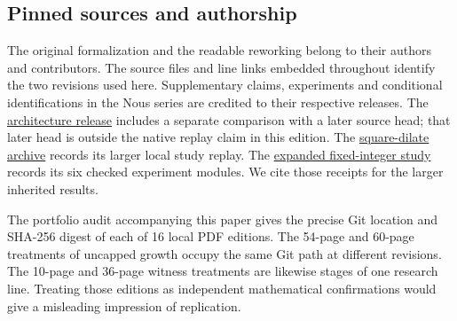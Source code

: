 \documentclass[12pt,letterpaper]{article}
\newcommand{\oldpaper}[2]{\href{https://github.com/nousentllc/riemann-hypothesis/tree/90e46dd4be3b077bfed33fa64280eb9f306c9d87/research/uriel/experiments/#1}{#2}}
\begin{document}
\subsection{Pinned sources and authorship}
The original formalization and the readable reworking belong to their authors and contributors. The source files and line links embedded throughout identify the two revisions used here. Supplementary claims, experiments and conditional identifications in the Nous series are credited to their respective releases. The \oldpaper{window-remainder-architecture}{architecture release} includes a separate comparison with a later source head; that later head is outside the native replay claim in this edition. The \oldpaper{ramified-square-dilates}{square-dilate archive} records its larger local study replay. The \oldpaper{fixed-datum-host-expanded}{expanded fixed-integer study} records its six checked experiment modules. We cite those receipts for the larger inherited results.

The portfolio audit accompanying this paper gives the precise Git location and SHA-256 digest of each of 16 local PDF editions. The 54-page and 60-page treatments of uncapped growth occupy the same Git path at different revisions. The 10-page and 36-page witness treatments are likewise stages of one research line. Treating those editions as independent mathematical confirmations would give a misleading impression of replication.
\end{document}
